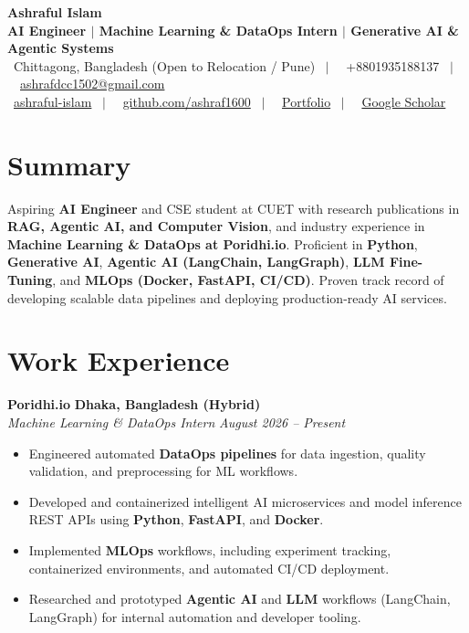\documentclass[a4paper,9.5pt]{article}
\newcommand{\experienceEntry}[5]{
  \vspace{2pt}
  \noindent\textbf{#1} \hfill \textbf{\small #2} \\
  \noindent\textit{\small #3} \hfill \textit{\small #4}
  \begin{itemize}[leftmargin=10pt, topsep=1pt, itemsep=1pt]
    #5
  \end{itemize}
}
\begin{document}
\begin{center}
    {\LARGE \textbf{Ashraful Islam}} \\[3pt]
    \footnotesize \textbf{\color{charcoal}AI Engineer $|$ Machine Learning \& DataOps Intern $|$ Generative AI \& Agentic Systems} \\[2pt]
    \footnotesize
    \faMapMarker*~Chittagong, Bangladesh (Open to Relocation / Pune) \ $|$ \ 
    \faPhone*~+8801935188137 \ $|$ \ 
    \faEnvelope~\href{mailto:ashrafdcc1502@gmail.com}{ashrafdcc1502@gmail.com} \\[1.5pt]
    \faLinkedin~\href{https://www.linkedin.com/in/ashraful-islam-a31268226/}{ashraful-islam} \ $|$ \ 
    \faGithub~\href{https://github.com/ashraf1600}{github.com/ashraf1600} \ $|$ \ 
    \faGlobe~\href{https://ashraf1600.github.io}{Portfolio} \ $|$ \ 
    \faGraduationCap~\href{https://scholar.google.com/citations?user=ashraf1600}{Google Scholar}
\end{center}

\vspace{-6pt}

\section{Summary}
\footnotesize{
Aspiring \textbf{AI Engineer} and CSE student at CUET with research publications in \textbf{RAG, Agentic AI, and Computer Vision}, and industry experience in \textbf{Machine Learning \& DataOps at Poridhi.io}. Proficient in \textbf{Python}, \textbf{Generative AI}, \textbf{Agentic AI (LangChain, LangGraph)}, \textbf{LLM Fine-Tuning}, and \textbf{MLOps (Docker, FastAPI, CI/CD)}. Proven track record of developing scalable data pipelines and deploying production-ready AI services.
}

\section{Work Experience}
\experienceEntry
  {Poridhi.io}{Dhaka, Bangladesh (Hybrid)}
  {Machine Learning \& DataOps Intern}{August 2026 -- Present}
  {
    \item Engineered automated \textbf{DataOps pipelines} for data ingestion, quality validation, and preprocessing for ML workflows.
    \item Developed and containerized intelligent AI microservices and model inference REST APIs using \textbf{Python}, \textbf{FastAPI}, and \textbf{Docker}.
    \item Implemented \textbf{MLOps} workflows, including experiment tracking, containerized environments, and automated CI/CD deployment.
    \item Researched and prototyped \textbf{Agentic AI} and \textbf{LLM} workflows (LangChain, LangGraph) for internal automation and developer tooling.
  }
\end{document}
